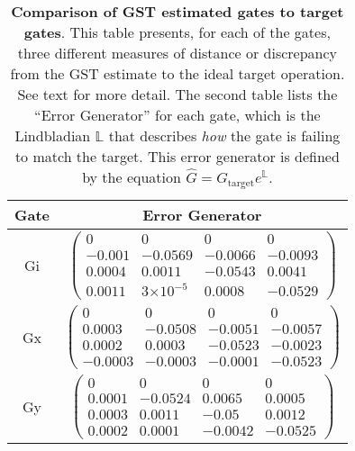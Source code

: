\documentclass{article}[11pt]
\providecommand{\e}[1]{\ensuremath{\times 10^{#1}}}
\begin{document}
\begin{table}[h]
\begin{center}
\vspace{2em}
\begin{tabular}[l]{|c|c|}
\hline
Gate & Error Generator \\ \hline
Gi & $ \left(\!\!\begin{array}{cccc}
0 & 0 & 0 & 0 \\ 
-0.001 & -0.0569 & -0.0066 & -0.0093 \\ 
0.0004 & 0.0011 & -0.0543 & 0.0041 \\ 
0.0011 & 3\e{-5} & 0.0008 & -0.0529
 \end{array}\!\!\right) $
 \\ \hline
Gx & $ \left(\!\!\begin{array}{cccc}
0 & 0 & 0 & 0 \\ 
0.0003 & -0.0508 & -0.0051 & -0.0057 \\ 
0.0002 & 0.0003 & -0.0523 & -0.0023 \\ 
-0.0003 & -0.0003 & -0.0001 & -0.0523
 \end{array}\!\!\right) $
 \\ \hline
Gy & $ \left(\!\!\begin{array}{cccc}
0 & 0 & 0 & 0 \\ 
0.0001 & -0.0524 & 0.0065 & 0.0005 \\ 
0.0003 & 0.0011 & -0.05 & 0.0012 \\ 
0.0002 & 0.0001 & -0.0042 & -0.0525
 \end{array}\!\!\right) $
 \\ \hline
\end{tabular}

\caption{\textbf{Comparison of GST estimated gates to target gates}.  This table presents, for each of the gates, three different measures of distance or discrepancy from the GST estimate to the ideal target operation.  See text for more detail.  The second table lists the ``Error Generator'' for each gate, which is the Lindbladian $\mathbb{L}$ that describes \emph{how} the gate is failing to match the target.  This error generator is defined by the equation $\hat{G} = G_{\mathrm{target}}e^{\mathbb{L}}$. \label{bestGatesetVsTargetTable}}
\end{center}
\end{table}
\end{document}

